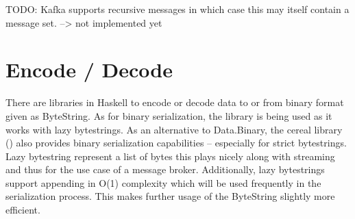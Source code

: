 TODO: Kafka supports recursive messages in which case this may itself contain a message set. --> not implemented yet  









\section{Encode / Decode}

There are libraries in Haskell to encode or decode data to or from binary
format given as ByteString. As for binary serialization, the
library is being used as it works with lazy bytestrings. As an alternative to
Data.Binary, the cereal library
()
also provides binary serialization capabilities -- especially for strict
bytestrings. Lazy bytestring represent a list of bytes this plays nicely along
with streaming and thus for the use case of a message broker. Additionally,
lazy bytestrings support appending in O(1) complexity which will be used
frequently in the serialization process. This makes further usage of the
ByteString slightly more efficient.

